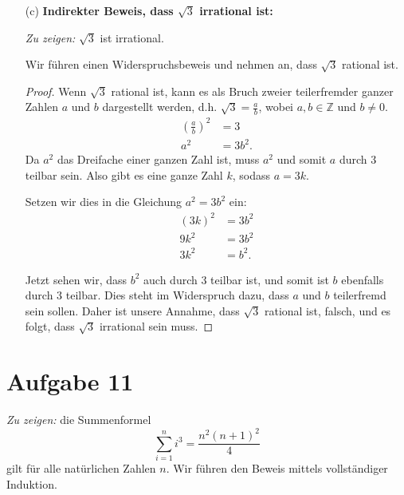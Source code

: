 \documentclass[12pt]{article}
\begin{document}
\begin{itemize}
\begin{proof}
			Da in beiden Fällen \( y^2 \) nicht durch 3 teilbar ist, wenn \( y \) nicht durch 3 teilbar ist, haben wir die Kontraposition der ursprünglichen Aussage bewiesen. Das bedeutet, dass unsere ursprüngliche Aussage wahr sein muss: Wenn \( y^2 \) durch 3 teilbar ist, dann muss auch \( y \) durch 3 teilbar sein.
		\end{proof}

	\item[(c)] \textbf{Indirekter Beweis, dass \( \sqrt{3} \) irrational ist:}

		\textit{Zu zeigen:} \( \sqrt{3} \) ist irrational.
		
		Wir führen einen Widerspruchsbeweis und nehmen an, dass \( \sqrt{3} \) rational ist.
		
		\begin{proof}
			Wenn \( \sqrt{3} \) rational ist, kann es als Bruch zweier teilerfremder ganzer Zahlen \( a \) und \( b \) dargestellt werden, d.h. \( \sqrt{3} = \frac{a}{b} \), wobei \( a, b \in \mathbb{Z} \) und \( b \neq 0 \).
			\begin{align*}
				(\frac{a}{b})^2 & = 3     \\
				a^2             & = 3b^2.
			\end{align*}
			Da \( a^2 \) das Dreifache einer ganzen Zahl ist, muss \( a^2 \) und somit \( a \) durch 3 teilbar sein. Also gibt es eine ganze Zahl \( k \), sodass \( a = 3k \).
			
			Setzen wir dies in die Gleichung \( a^2 = 3b^2 \) ein:
			\begin{align*}
				(3k)^2 & = 3b^2  \\
				9k^2   & = 3b^2  \\
				3k^2   & = b^2.
			\end{align*}
			
			Jetzt sehen wir, dass \( b^2 \) auch durch 3 teilbar ist, und somit ist \( b \) ebenfalls durch 3 teilbar. Dies steht im Widerspruch dazu, dass \( a \) und \( b \) teilerfremd sein sollen. Daher ist unsere Annahme, dass \( \sqrt{3} \) rational ist, falsch, und es folgt, dass \( \sqrt{3} \) irrational sein muss.
		\end{proof}
\end{itemize}

\section*{Aufgabe 11}

\textit{Zu zeigen:} die Summenformel 
\[
	\sum_{i=1}^{n} i^3 = \frac{n^2(n + 1)^2}{4}
\]
gilt für alle natürlichen Zahlen \( n \). Wir führen den Beweis mittels vollständiger Induktion.
\end{document}

